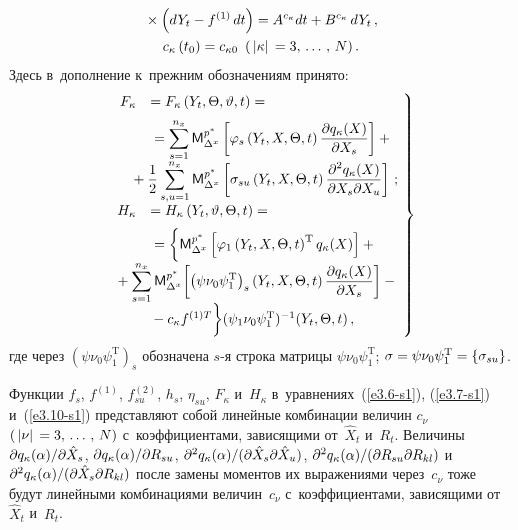 \begin{multicols}{2}
\noindent
\begin{multline}
{}\times \left(dY_t - f^{(1)}\, dt\right)= 
A^{c_\kappa} dt + B^{c_\kappa}\, dY_t\,,\\ 
c_\kappa \left(t_0\right) = c_{\kappa0} \enskip (\,\left\vert\kappa\right\vert\,= 3,\,\ldots\,,\, N)\,.
\label{e3.10-s1}
\end{multline}
Здесь в~дополнение к~прежним обозначениям принято:
\begin{equation}
\left.
\begin{array}{rl}
F_\kappa &=\displaystyle F_\kappa \left(Y_t,\Theta,\vartheta,t\right) 
={}\\[6pt]
&\displaystyle{}=\sss_{s=1}^{n_x}
   \mm_{\Delta^x}^{p^*} \lk \varphi_s\left (Y_t,X,\Theta,t\right)
   \fr{\partial q_\kappa (X)}{\partial X_s}\rk+{}\\[6pt]
&\displaystyle\hspace*{-5mm}{}+\fr{1}{2} \sss_{s,u=1}^{n_x}
     \mm_{\Delta^x}^{p^*}\lk \si_{su} \left(Y_t,X,\Theta,t\right)\fr{\partial^2 q_\kappa
    (X)}{\partial X_s\partial X_u}\rk\,;\\[6pt]
H_\kappa &= \displaystyle H_\kappa \left(Y_t,\vartheta,\Theta,t\right) ={}\\[6pt]
&\displaystyle{}=
\biggl\{  \mm_{\Delta^x}^{p^*}
   \lk \varphi_1 \left(Y_t,X,\Theta,t\right)^{\mathrm{T}} q_\kappa (X)\rk+{}\\[6pt]
&\hspace*{-9mm}{}\displaystyle+ \sss_{s=1}^{n_x}
     \mm_{\Delta^x}^{p^*}\!\lk \left(\psi\nu_0\psi_1^{\mathrm{T}}\right)_s 
     \left(Y_t,X,\Theta,t\right)\fr{\partial
    q_\kappa (X)}{\partial X_s} \rk- {}\\[6pt]
    &{}-c_\kappa
    f^{(1)T} \biggr\} \pss^{-1} (Y_t,\Theta,t)\,,
    \end{array}\!
    \right\}\!
    \label{e3.11-s1}
    \end{equation}
где через $(\psi\nu_0\psi_1^{\mathrm{T}})_s$ обозначена  $s$-я строка матрицы
$\psi\nu_0\psi_1^{\mathrm{T}}$; $\si\hm=\psi\nu_0\psi_1^{\mathrm{T}} 
\hm=\lf \si_{su}\rf$.

Функции  $f_s$,
$f^{(1)}$, $f^{(2)}_{su}$, $h_s$, $\eta_{su}$, $F_\kappa$ 
и~$H_\kappa$ в~уравнениях~(\ref{e3.6-s1}), (\ref{e3.7-s1}) 
и~(\ref{e3.10-s1}) представляют
собой линейные комбинации величин  $c_\nu$ $(\lv\nu\rv \hm= 3\tr N)$
с~коэффициентами, зависящими от~$\hat X_t$ и~$R_t$. Величины
$\partial q_\kappa (\alpha)/\partial \hat X_s$, $\partial q_\kappa
(\alpha)/\partial R_{su}$, $\partial^2 q_\kappa (\alpha)/(\partial \hat
X_s \partial \hat X_u)$, $\partial^2 q_\kappa (\alpha)/(\partial
R_{su} \partial R_{kl})$ и~$\partial^2 q_\kappa (\alpha)/(\partial \hat
X_s \partial R_{kl})$ после замены моментов их выражениями
через~$c_\nu$ тоже будут линейными комбинациями величин~$c_\nu$ 
с~коэффициентами, зависящими от~$\hat X_t$ и~$R_t$.


\end{multicols}
